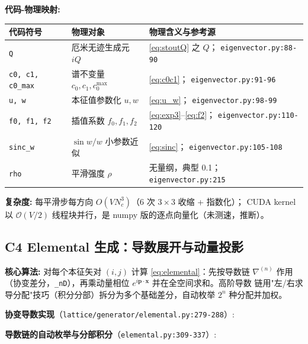 \documentclass[UTF8]{ctexart}
\begin{document}
\begin{mapbox}
\textbf{代码-物理映射:}
\end{mapbox}
\begin{xltabular}{\textwidth}{llX}
\toprule
\textcolor{map}{代码符号} & 物理对象 & 物理含义与参考源 \\
\midrule
\endhead
\texttt{Q} & 厄米无迹生成元 $iQ$ & \eqref{eq:stoutQ} 之 $Q$；
  \texttt{\nolinkurl{eigenvector.py:88-90}} \\
\texttt{c0, c1, c0\_max} & 谱不变量 $c_0, c_1, c_0^{\max}$ & \eqref{eq:c0c1}；
  \texttt{\nolinkurl{eigenvector.py:91-96}} \\
\texttt{u, w} & 本征值参数化 $u, w$ & \eqref{eq:u_w}；
  \texttt{\nolinkurl{eigenvector.py:98-99}} \\
\texttt{f0, f1, f2} & 插值系数 $f_0,f_1,f_2$ & \eqref{eq:exp3}--\eqref{eq:f2}；
  \texttt{\nolinkurl{eigenvector.py:110-120}} \\
\texttt{sinc\_w} & $\sin w/w$ 小参数近似 & \eqref{eq:sinc}；
  \texttt{\nolinkurl{eigenvector.py:105-108}} \\
\texttt{rho} & 平滑强度 $\rho$ & 无量纲，典型 0.1；
  \texttt{\nolinkurl{eigenvector.py:215}} \\
\bottomrule
\end{xltabular}

\textbf{复杂度:} 每平滑步每方向 $O(V N_c^3)$（6 次 $3\times3$ 收缩 + 指数化）；
CUDA kernel 以 $\mathcal O(V/2)$ 线程块并行，是 numpy 版的逐点向量化（未测速，推断）。

\subsection{C4 Elemental 生成：导数展开与动量投影}
\label{sec:c4}

\begin{algobox}
\textbf{核心算法:} 对每个本征矢对 $(i,j)$ 计算 \eqref{eq:elemental}：先按导数链 $\nabla^{(n)}$ 作用
（协变差分，\texttt{\_nD}），再乘动量相位 $e^{i\mathbf p\cdot\mathbf x}$ 并在全空间求和。高阶导数
链用"左/右求导分配"技巧（积分分部）拆分为多个基础差分，自动枚举 $2^n$ 种分配并加权。
\end{algobox}

\textbf{协变导数实现}（\texttt{lattice/generator/elemental.py:279-288}）:


\textbf{导数链的自动枚举与分部积分}（\texttt{elemental.py:309-337}）:

\end{document}

